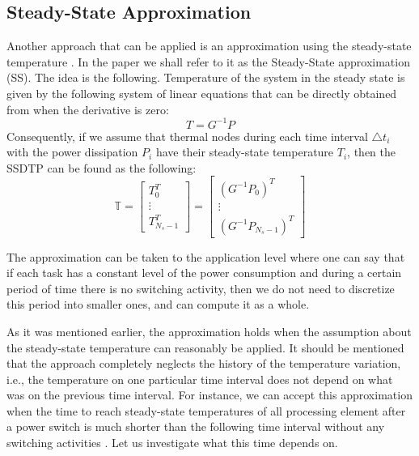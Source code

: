 \subsection{Steady-State Approximation}
Another approach that can be applied is an approximation using the steady-state temperature \cite{huang2009}. In the paper we shall refer to it as the Steady-State approximation (SS). The idea is the following. Temperature of the system in the steady state is given by the following system of linear equations that can be directly obtained from  when the derivative is zero:
\[
  T = G^{-1} P
\]
Consequently, if we assume that thermal nodes during each time interval $\triangle t_i$ with the power dissipation $P_i$ have their steady-state temperature $T_i$, then the SSDTP can be found as the following:
\begin{equation*}
  \mathbb{T} = \left[
    \begin{array}{c}
      T_0^T \\
      \vdots \\
      T_{N_s - 1}^T
    \end{array}
  \right] = \left[
    \begin{array}{c}
      (G^{-1} P_0)^T \\
      \vdots \\
      (G^{-1} P_{N_s - 1})^T
    \end{array}
  \right]
\end{equation*}

The approximation can be taken to the application level where one can say that if each task has a constant level of the power consumption and during a certain period of time there is no switching activity, then we do not need to discretize this period into smaller ones, and can compute it as a whole.

As it was mentioned earlier, the approximation holds when the assumption about the steady-state temperature can reasonably be applied. It should be mentioned that the approach completely neglects the history of the temperature variation, i.e., the temperature on one particular time interval does not depend on what was on the previous time interval. For instance, we can accept this approximation when the time to reach steady-state temperatures of all processing element after a power switch is much shorter than the following time interval without any switching activities \cite{huang2009}. Let us investigate what this time depends on.

